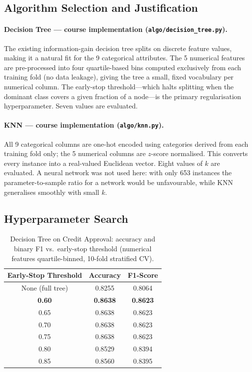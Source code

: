 \documentclass[11pt,letterpaper]{article}
\begin{document}
\subsection{Algorithm Selection and Justification}

\paragraph{Decision Tree --- course implementation (\texttt{algo/decision\_tree.py}).}
The existing information-gain decision tree splits on discrete feature values,
making it a natural fit for the 9 categorical attributes.  The 5 numerical
features are pre-processed into four quartile-based bins computed exclusively
from each training fold (no data leakage), giving the tree a small, fixed
vocabulary per numerical column.  The early-stop threshold---which halts
splitting when the dominant class covers a given fraction of a node---is the
primary regularisation hyperparameter.  Seven values are evaluated.

\paragraph{KNN --- course implementation (\texttt{algo/knn.py}).}
All 9 categorical columns are one-hot encoded using categories derived from
each training fold only; the 5 numerical columns are $z$-score normalised.
This converts every instance into a real-valued Euclidean vector.  Eight
values of $k$ are evaluated.  A neural network was not used here: with only
653 instances the parameter-to-sample ratio for a network would be
unfavourable, while KNN generalises smoothly with small $k$.

\subsection{Hyperparameter Search}

\begin{table}[ht]
\centering
\caption{Decision Tree on Credit Approval: accuracy and binary F1 vs.\
         early-stop threshold (numerical features quartile-binned,
         10-fold stratified CV).}
\label{tab:d4_dt}
\begin{tabular}{@{}ccc@{}}
\toprule
Early-Stop Threshold & Accuracy & F1-Score \\
\midrule
None (full tree) & 0.8255 & 0.8064 \\
\rowcolor{hilight}
\textbf{0.60} & \textbf{0.8638} & \textbf{0.8623} \\
0.65 & 0.8638 & 0.8623 \\
0.70 & 0.8638 & 0.8623 \\
0.75 & 0.8638 & 0.8623 \\
0.80 & 0.8529 & 0.8394 \\
0.85 & 0.8560 & 0.8395 \\
\bottomrule
\end{tabular}
\end{table}
\end{document}
